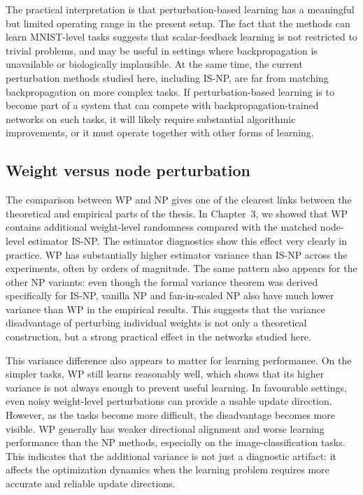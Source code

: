 The practical interpretation is that perturbation-based learning has a meaningful but limited operating range in the present setup. The fact that the methods can learn MNIST-level tasks suggests that scalar-feedback learning is not restricted to trivial problems, and may be useful in settings where backpropagation is unavailable or biologically implausible. At the same time, the current perturbation methods studied here, including IS-NP, are far from matching backpropagation on more complex tasks. If perturbation-based learning is to become part of a system that can compete with backpropagation-trained networks on such tasks, it will likely require substantial algorithmic improvements, or it must operate together with other forms of learning.
\subsection{Weight versus node perturbation}

The comparison between WP and NP gives one of the clearest links between the theoretical and empirical parts of the thesis. In Chapter~3, we showed that WP contains additional weight-level randomness compared with the matched node-level estimator IS-NP. The estimator diagnostics show this effect very clearly in practice. WP has substantially higher estimator variance than IS-NP across the experiments, often by orders of magnitude. The same pattern also appears for the other NP variants: even though the formal variance theorem was derived specifically for IS-NP, vanilla NP and fan-in-scaled NP also have much lower variance than WP in the empirical results. This suggests that the variance disadvantage of perturbing individual weights is not only a theoretical construction, but a strong practical effect in the networks studied here.

This variance difference also appears to matter for learning performance. On the simpler tasks, WP still learns reasonably well, which shows that its higher variance is not always enough to prevent useful learning. In favourable settings, even noisy weight-level perturbations can provide a usable update direction. However, as the tasks become more difficult, the disadvantage becomes more visible. WP generally has weaker directional alignment and worse learning performance than the NP methods, especially on the image-classification tasks. This indicates that the additional variance is not just a diagnostic artifact: it affects the optimization dynamics when the learning problem requires more accurate and reliable update directions.

